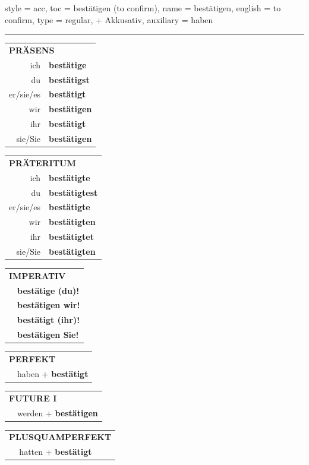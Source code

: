 \begin{verbentry}{
  style = {acc},
  toc = {bestätigen (to confirm)},
  name = {bestätigen},
  english = {to confirm},
  type = {regular, + Akkusativ},
  auxiliary = {haben}
}
 

\vspace{5pt}
\hrule
\vspace{5pt}

\begin{tabular}{rl}
\multicolumn{2}{l}{\textbf{PRÄSENS}}\\
ich & \textbf{bestätige}\\
du & \textbf{bestätigst}\\
er/sie/es & \textbf{bestätigt}\\
wir & \textbf{bestätigen}\\
ihr & \textbf{bestätigt}\\
sie/Sie & \textbf{bestätigen}\\
\end{tabular}
\hfill
\begin{tabular}{rl}
\multicolumn{2}{l}{\textbf{PRÄTERITUM}}\\
ich & \textbf{bestätigte}\\
du & \textbf{bestätigtest}\\
er/sie/es & \textbf{bestätigte}\\
wir & \textbf{bestätigten}\\
ihr & \textbf{bestätigtet}\\
sie/Sie & \textbf{bestätigten}\\
\end{tabular}
\hfill
\begin{tabular}{rl}
\multicolumn{2}{l}{\textbf{IMPERATIV}}\\
& \textbf{bestätige (du)!}\\
& \textbf{bestätigen wir!}\\
& \textbf{bestätigt (ihr)!}\\
& \textbf{bestätigen Sie!}\\
\end{tabular}

\vspace{10pt}

\begin{tabular}{rl}
\multicolumn{2}{l}{\textbf{PERFEKT}}\\
& haben + \textbf{bestätigt}\\
\end{tabular}
\hfill
\begin{tabular}{rl}
\multicolumn{2}{l}{\textbf{FUTURE I}}\\
& werden + \textbf{bestätigen}\\
\end{tabular}
\hfill
\begin{tabular}{rl}
\multicolumn{2}{l}{\textbf{PLUSQUAMPERFEKT}}\\
& hatten + \textbf{bestätigt}\\
\end{tabular}


\end{verbentry}
